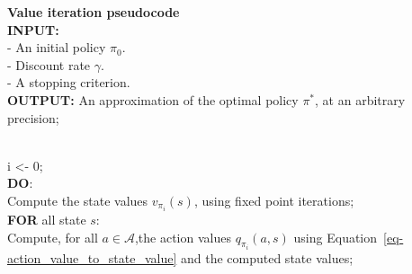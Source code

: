 \documentclass[
  letterpaper,
]{report}
\theoremstyle{plain}
\theoremstyle{definition}
\theoremstyle{definition}
\theoremstyle{remark}
\begin{document}
\textbf{Value iteration pseudocode}\\
\textbf{INPUT:}\\
- An initial policy \(\pi_0\).\\
- Discount rate \(\gamma\).\\
- A stopping criterion.\\
\textbf{OUTPUT:} An approximation of the optimal policy \(\pi^*\), at an
arbitrary precision;\\
\strut \\
i \textless- 0;\\
\textbf{DO}:\\
\hspace*{0.333em}\hspace*{0.333em}\hspace*{0.333em}\hspace*{0.333em}\hspace*{0.333em}\hspace*{0.333em}Compute
the state values \(v_{\pi_i}(s)\), using fixed point iterations;\\
\hspace*{0.333em}\hspace*{0.333em}\hspace*{0.333em}\hspace*{0.333em}\hspace*{0.333em}\hspace*{0.333em}\textbf{FOR}
all state \(s\):\\
\hspace*{0.333em}\hspace*{0.333em}\hspace*{0.333em}\hspace*{0.333em}\hspace*{0.333em}\hspace*{0.333em}\hspace*{0.333em}\hspace*{0.333em}\hspace*{0.333em}\hspace*{0.333em}\hspace*{0.333em}\hspace*{0.333em}\hspace*{0.333em}\hspace*{0.333em}\hspace*{0.333em}Compute,
for all \(a\in\mathcal{A}\),the action values \(q_{\pi_i}(a,s)\) using
Equation~\ref{eq-action_value_to_state_value} and the computed state
values;\\
\end{document}

